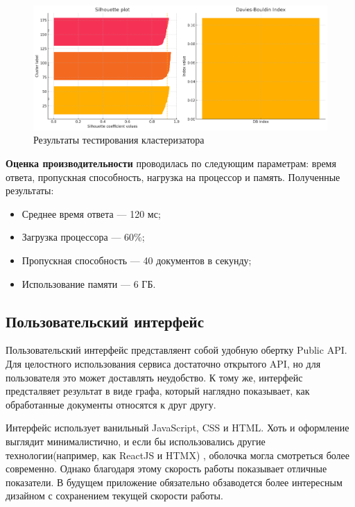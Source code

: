 \begin{itemize}
\begin{figure}[H]
    \centering
    \includegraphics[width=1\textwidth]{styles/diploma/inc/clusturizer_tests1.png} 
    \caption{Результаты тестирования кластеризатора}
    \label{fig:example}
\end{figure}

\vspace{1em}

\textbf{Оценка производительности} проводилась по следующим параметрам: время ответа, пропускная способность, нагрузка на процессор и память. Полученные результаты:
\begin{itemize}
    \item Среднее время ответа — 120 мс;
    \item Загрузка процессора — 60\%;
    \item Пропускная способность — 40 документов в секунду;
    \item Использование памяти — 6 ГБ.
\end{itemize}

\subsection{Пользовательский интерфейс}
Пользовательский интерфейс представляент собой удобную обертку Public API. Для целостного использования сервиса достаточно открытого API, но для пользователя это может доставлять неудобство.
К тому же, интерфейс предсталвяет результат в виде графа, который наглядно показывает, как обработанные документы относятся  к друг другу.

Интерфейс использует ванильный JavaScript, CSS и HTML. Хоть и оформление выглядит минималистично, и если бы использовались другие технологии(например, как ReactJS и HTMX) , оболочка могла смотреться более современно. Однако благодаря этому скорость работы показывает отличные показатели. В будущем приложение обязательно  обзаводется более интересным дизайном с сохранением текущей скорости работы.



\end{itemize}
